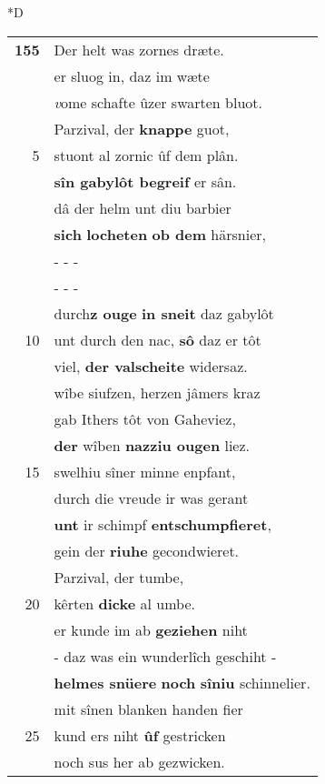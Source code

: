 \documentclass[8pt,a4paper,notitlepage]{article}
\begin{document}
\begin{table}[ht]
\begin{minipage}[t]{0.5\linewidth}
\small
\begin{center}*D
\end{center}
\begin{tabular}{rl}
\textbf{155} & Der helt was zornes dræte.\\ 
 & er sluog in, daz im wæte\\ 
 & \textit{v}ome schafte ûzer swarten bluot.\\ 
 & Parzival, der \textbf{knappe} guot,\\ 
5 & stuont al zornic ûf dem plân.\\ 
 & \textbf{sîn gabylôt begreif} er sân.\\ 
 & dâ der helm unt diu barbier\\ 
 & \textbf{sich} \textbf{locheten} \textbf{ob dem} härsnier,\\ 
 & \multicolumn{1}{l}{ - - - }\\ 
 & \multicolumn{1}{l}{ - - - }\\ 
 & durch\textbf{z ouge} \textbf{in sneit} daz gabylôt\\ 
10 & unt durch den nac, \textbf{sô} daz er tôt\\ 
 & viel, \textbf{der valscheite} widersaz.\\ 
 & wîbe siufzen, herzen jâmers kraz\\ 
 & gab Ithers tôt von Gaheviez,\\ 
 & \textbf{der} wîben \textbf{nazziu ougen} liez.\\ 
15 & swelhiu sîner minne enpfant,\\ 
 & durch die vreude ir was gerant\\ 
 & \textbf{unt} ir schimpf \textbf{entschumpfieret},\\ 
 & gein der \textbf{riuhe} gecondwieret.\\ 
 & Parzival, der tumbe,\\ 
20 & kêrten \textbf{dicke} al umbe.\\ 
 & er kunde im ab \textbf{geziehen} niht\\ 
 & - daz was ein wunderlîch geschiht -\\ 
 & \textbf{helmes snüere} \textbf{noch} \textbf{sîniu} schinnelier.\\ 
 & mit sînen blanken handen fier\\ 
25 & kund ers niht \textbf{ûf} gestricken\\ 
 & noch sus her ab gezwicken.\\ 

\end{tabular}
\end{minipage}
\end{table}
\end{document}
